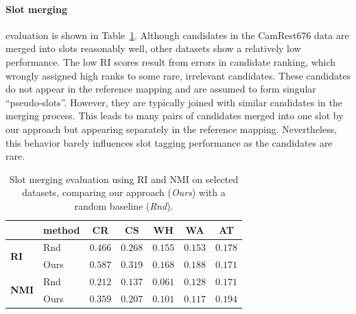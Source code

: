 \paragraph{Slot merging}\hspace{-3mm} evaluation is shown in Table~\ref{table:merging}.
Although candidates in the CamRest676 data are merged into slots reasonably well, other datasets show a relatively low performance.
The low RI scores result from errors in candidate ranking, which wrongly assigned high ranks to some rare, irrelevant candidates.
These candidates do not appear in the reference mapping and are assumed to form singular “pseudo-slots”.
However, they are typically joined with similar candidates in the merging process.
This leads to many pairs of candidates merged into one slot by our approach but appearing separately in the reference mapping.
Nevertheless, this behavior barely influences slot tagging performance as the candidates are rare.
\begin{table}[tp]
    \centering
    \small
    
    \begin{tabular}{ll|ccccc}
    \hline
      & \textbf{method}\hspace{-3mm} & \textbf{CR} & \textbf{CS} & \textbf{WH} & \textbf{WA} & \textbf{AT} \\
     \hline
     \multirow{2}{*}{\textbf{RI}} & Rnd & $0.466$ & $0.268$ & $0.155$ & $0.153$ & $0.178$ \\
     & Ours & $0.587$ & $0.319$ & $0.168$ & $0.188$ & $0.171$ \\\hline
     \multirow{2}{*}{\textbf{NMI}\hspace{-2mm}} & Rnd & $0.212$ & $0.137$ & $0.061$ & $0.128$ & $0.171$ \\
     & Ours & $0.359$ & $0.207$ & $0.101$ & $0.117$ & $0.194$ \\

     \hline
    \end{tabular}
    
    \caption{Slot merging evaluation using RI and NMI on selected datasets, comparing our approach (\emph{Ours}) with a random baseline (\emph{Rnd}).}
    \label{table:merging}
\end{table}

